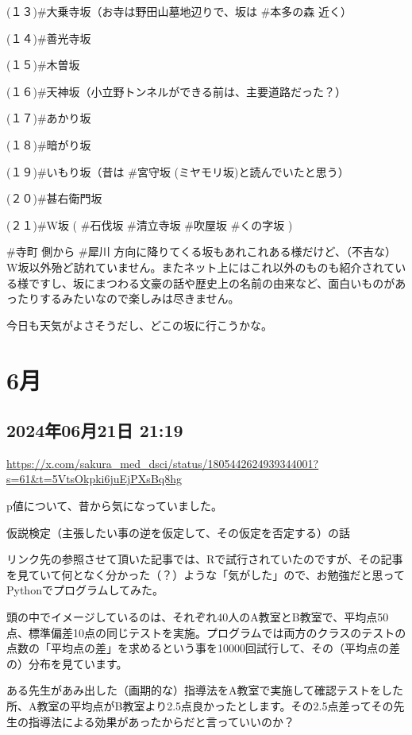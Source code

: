 (１３)\#大乗寺坂（お寺は野田山墓地辺りで、坂は \#本多の森 近く）

(１４)\#善光寺坂

(１５)\#木曽坂

(１６)\#天神坂（小立野トンネルができる前は、主要道路だった？）

(１７)\#あかり坂

(１８)\#暗がり坂

(１９)\#いもり坂（昔は \#宮守坂 (ミヤモリ坂)と読んでいたと思う）

(２０)\#甚右衛門坂

(２１)\#W坂 ( \#石伐坂 \#清立寺坂 \#吹屋坂 \#くの字坂 )

\#寺町 側から \#犀川 方向に降りてくる坂もあれこれある様だけど、（不吉な）W坂以外殆ど訪れていません。またネット上にはこれ以外のものも紹介されている様ですし、坂にまつわる文豪の話や歴史上の名前の由来など、面白いものがあったりするみたいなので楽しみは尽きません。

今日も天気がよさそうだし、どこの坂に行こうかな。

\section{6月}

\subsection*{2024年06月21日 21:19}

\url{https://x.com/sakura_med_dsci/status/1805442624939344001?s=61&t=5VtsOkpki6juEjPXsBq8hg}

p値について、昔から気になっていました。

仮説検定（主張したい事の逆を仮定して、その仮定を否定する）の話

リンク先の参照させて頂いた記事では、Rで試行されていたのですが、その記事を見ていて何となく分かった（？）ような「気がした」ので、お勉強だと思ってPythonでプログラムしてみた。

頭の中でイメージしているのは、それぞれ40人のA教室とB教室で、平均点50点、標準偏差10点の同じテストを実施。プログラムでは両方のクラスのテストの点数の「平均点の差」を求めるという事を10000回試行して、その（平均点の差の）分布を見ています。

ある先生があみ出した（画期的な）指導法をA教室で実施して確認テストをした所、A教室の平均点がB教室より2.5点良かったとします。その2.5点差ってその先生の指導法による効果があったからだと言っていいのか？

